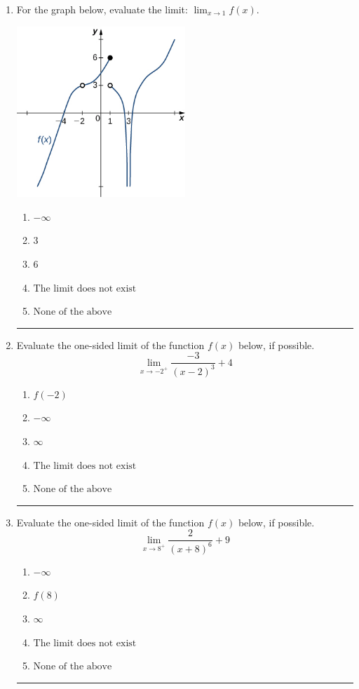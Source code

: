 \documentclass[14pt]{extbook}
\newcommand{\litem}[1]{\item#1\hspace*{-1cm}\rule{\textwidth}{0.4pt}}
\begin{document}
\begin{enumerate}
{\begin{enumerate}[label=\Alph*.]
\end{enumerate} }
\litem{
For the graph below, evaluate the limit: $ \displaystyle \lim_{x \rightarrow 1} f(x)$.
\begin{center}
    \includegraphics[width=0.5\textwidth]{../Figures/evaluateLimitGraphicallyA.png}
\end{center}
\begin{enumerate}[label=\Alph*.]
\item \( -\infty \)
\item \( 3 \)
\item \( 6 \)
\item \( \text{The limit does not exist} \)
\item \( \text{None of the above} \)

\end{enumerate} }
\litem{
Evaluate the one-sided limit of the function $f(x)$ below, if possible.\[ \lim_{x \rightarrow -2^+} \frac{-3}{(x-2)^3}+4 \]\begin{enumerate}[label=\Alph*.]
\item \( f(-2) \)
\item \( -\infty \)
\item \( \infty \)
\item \( \text{The limit does not exist} \)
\item \( \text{None of the above} \)

\end{enumerate} }
\litem{
Evaluate the one-sided limit of the function $f(x)$ below, if possible.\[ \lim_{x \rightarrow 8^+} \frac{2}{(x+8)^6}+9 \]\begin{enumerate}[label=\Alph*.]
\item \( -\infty \)
\item \( f(8) \)
\item \( \infty \)
\item \( \text{The limit does not exist} \)
\item \( \text{None of the above} \)


\end{enumerate}}
\end{enumerate}
\end{document}
